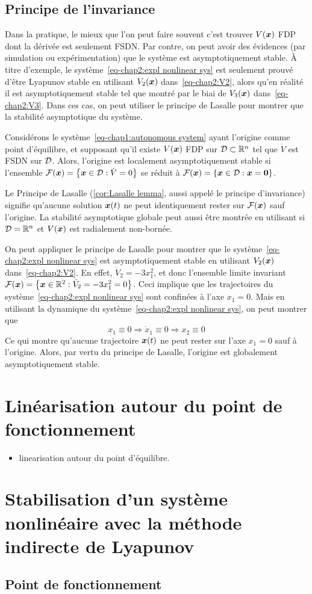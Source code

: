 \subsection{Principe de l'invariance}
Dans la pratique, le mieux que l'on peut faire souvent c'est trouver $V(\bm{x})$ FDP dont la dérivée est seulement FSDN. Par contre, on peut avoir des évidences (par simulation ou expérimentation) que le système est asymptotiquement stable. À titre d'exemple, le système~\eqref{eq-chap2:expl nonlinear sys} est seulement prouvé d'être Lyapunov stable en utilisant $V_2(\bm{x})$ dans~\eqref{eq-chap2:V2}, alors qu'en réalité il est asymptotiquement stable tel que montré par le biai de   $V_3(\bm{x})$ dans~\eqref{eq-chap2:V3}. Dans ces cas, on peut  utiliser le principe de Lasalle pour montrer que la stabilité asymptotique du système. 
\begin{corolaire}\label{cor:Lasalle lemma}
	Considérons le système~\eqref{eq-chap1:autonomous system} ayant l'origine comme point d'équilibre, et supposant qu'il existe $V(\bm{x})$ FDP sur ${\cal D}\subset\mathbb{R}^n$ tel que $\dot{V}$ est FSDN sur ${\cal D}$. Alors, l'origine est localement asymptotiquement stable si l'ensemble 
	 ${\cal F}(\bm{x})=\left\{\bm{x}\in{\cal D}: \dot{V}=0\right\}$ se réduit à  ${\cal F}(\bm{x})=\left\{\bm{x}\in{\cal D}: \bm{x}=\mathbf{0}\right\}$. 
\end{corolaire}
Le Principe de Lasalle (\cref{cor:Lasalle lemma}, aussi appelé le principe d'invariance) signifie qu'aucune solution $\bm{x}(t)$ ne peut identiquement rester sur ${\cal F}(\bm{x})$ sauf l'origine.
La stabilité asymptotique globale peut aussi être montrée en utilisant si ${\cal D}=\mathbb{R}^n$ et $V(\bm{x})$ est radialement non-bornée. 

On peut appliquer le principe de Lasalle pour montrer que le système~\eqref{eq-chap2:expl nonlinear sys} est asymptotiquement stable en utilisant $V_2(\bm{x})$ dans~\eqref{eq-chap2:V2}. En effet, $\dot{V}_2 = -3x_1^2$, et donc l'ensemble limite invariant ${\cal F}(\bm{x}) = \left\{\bm{x}\in \mathbb{R}^2:\dot{V}_2 = -3x_1^2=0\right\}$. Ceci implique que les trajectoires du système~\eqref{eq-chap2:expl nonlinear sys} sont confinées à l'axe $x_1=0$. Mais en utilisant la dynamique du système~\eqref{eq-chap2:expl nonlinear sys}, on peut montrer que  
\begin{equation*}
	x_1\equiv0 \Rightarrow \dot{x}_1\equiv0 \Rightarrow x_2\equiv0
\end{equation*}
Ce qui montre qu'aucune trajectoire $\bm{x}(t)$ ne peut rester sur l'axe $x_1=0$ sauf à l'origine. Alors, par vertu du principe de Lasalle, l'origine est globalement asymptotiquement stable.
\section{Linéarisation autour du point de fonctionnement}

\begin{itemize}
	\item linearisation autour du point d'équilibre.
\end{itemize}


\section{Stabilisation d'un système nonlinéaire avec la méthode indirecte de Lyapunov}
\subsection{Point de fonctionnement}